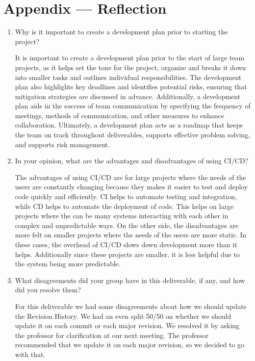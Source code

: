 \documentclass{article}
\begin{document}
\newpage{}

\section*{Appendix --- Reflection}



\begin{enumerate}
    \item Why is it important to create a development plan prior to starting the
    project?

    It is important to create a development plan prior to the start of large team projects, as it helps set the tone for the project, organize and breaks it down into smaller tasks and outlines individual responsibilities. 
    The development plan also highlights key deadlines and identifies potential risks, ensuring that mitigation strategies are discussed in advance.
    Additionally, a development plan aids in the success of team communication by specifying the frequency of meetings, methods of communication, and other measures to enhance collaboration.
    Ultimately, a development plan acts as a roadmap that keeps the team on track throughout deliverables, supports effective problem solving, and supports risk management.

    \item In your opinion, what are the advantages and disadvantages of using
    CI/CD?

    The advantages of using CI/CD are for large projects where the needs of the users are constantly changing because they makes it easier to test and deploy code quickly and efficiently.
    CI helps to automate testing and integration, while CD helps to automate the deployment of code.
    This helps on large projects where the can be many systems interacting with each other in complex and unpredictable ways.
    On the other side, the disadvantages are more felt on smaller projects where the needs of the users are more static.
    In these cases, the overhead of CI/CD slows down development more than it helps.
    Additionally since these projects are smaller, it is less helpful due to the system being more predictable.


    \item What disagreements did your group have in this deliverable, if any,
    and how did you resolve them?

    For this deliverable we had some disagreements about how we should update the Revision History.
    We had an even split 50/50 on whether we should update it on each commit or each major revision.
    We resolved it by asking the professor for clarification at our next meeting.
    The professor recommended that we update it on each major revision, so we decided to go with that.

    
\end{enumerate}
\end{document}
